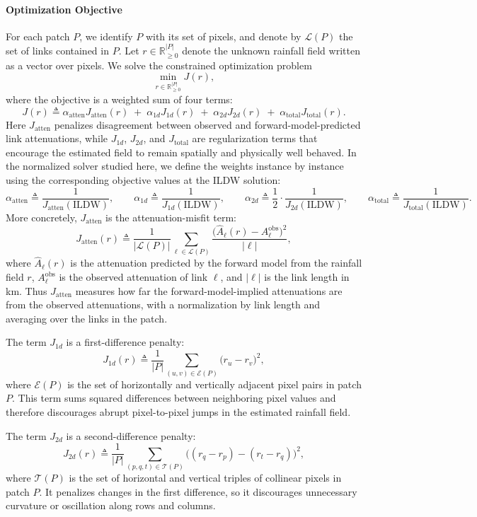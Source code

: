 \documentclass[11pt]{article}
\begin{document}
\paragraph*{Optimization Objective}
For each patch $P$, we identify $P$ with its set of pixels, and denote by $\mathcal{L}(P)$ the set of links contained in $P$. Let $r\in\mathbb{R}_{\ge 0}^{|P|}$ denote the unknown rainfall field written as a vector over pixels. We solve the constrained optimization problem
\[
\min_{r\in\mathbb{R}_{\ge 0}^{|P|}} J(r),
\]
where the objective is a weighted sum of four terms:
\[
J(r)\triangleq
\alpha_{\mathrm{atten}} J_{\mathrm{atten}}(r)
\;+\;
\alpha_{1d} J_{1d}(r)
\;+\;
\alpha_{2d} J_{2d}(r)
\;+\;
\alpha_{\mathrm{total}} J_{\mathrm{total}}(r).
\]
Here $J_{\mathrm{atten}}$ penalizes disagreement between observed and forward-model-predicted link attenuations, while $J_{1d}$, $J_{2d}$, and $J_{\mathrm{total}}$ are regularization terms that encourage the estimated field to remain spatially and physically well behaved. In the normalized solver studied here, we define the weights instance by instance using the corresponding objective values at the ILDW solution:
\[
\alpha_{\mathrm{atten}}\triangleq\frac{1}{J_{\mathrm{atten}}({\mathrm{ILDW}})},\qquad
\alpha_{1d}\triangleq\frac{1}{J_{1d}({\mathrm{ILDW}})},\qquad
\alpha_{2d}\triangleq\frac{1}{2} \cdot\frac{1}{J_{2d}({\mathrm{ILDW}})},\qquad
\alpha_{\mathrm{total}}\triangleq\frac{1}{J_{\mathrm{total}}({\mathrm{ILDW}})}.
\]
More concretely, $J_{\mathrm{atten}}$ is the attenuation-misfit term:
\[
J_{\mathrm{atten}}(r)\triangleq\frac{1}{|\mathcal{L}(P)|}\sum_{\ell\in\mathcal{L}(P)}
\frac{\bigl(\widehat{A}_\ell(r)-A_\ell^{\mathrm{obs}}\bigr)^2}{|\ell|},
\]
where $\widehat{A}_\ell(r)$ is the attenuation predicted by the forward model from the rainfall field $r$, $A_\ell^{\mathrm{obs}}$ is the observed attenuation of link $\ell$, and $|\ell|$ is the link length in km. Thus $J_{\mathrm{atten}}$ measures how far the forward-model-implied attenuations are from the observed attenuations, with a normalization by link length and averaging over the links in the patch.

The term $J_{1d}$ is a first-difference penalty:
\[
J_{1d}(r)\triangleq\frac{1}{|P|}\sum_{(u,v)\in\mathcal{E}(P)}\bigl(r_u-r_v\bigr)^2,
\]
where $\mathcal{E}(P)$ is the set of horizontally and vertically adjacent pixel pairs in patch $P$. This term sums squared differences between neighboring pixel values and therefore discourages abrupt pixel-to-pixel jumps in the estimated rainfall field.

The term $J_{2d}$ is a second-difference penalty:
\[
J_{2d}(r)\triangleq\frac{1}{|P|}\sum_{(p,q,t)\in\mathcal{T}(P)}
\bigl((r_q-r_p)-(r_t-r_q)\bigr)^2,
\]
where $\mathcal{T}(P)$ is the set of horizontal and vertical triples of collinear pixels in patch $P$. It penalizes changes in the first difference, so it discourages unnecessary curvature or oscillation along rows and columns.
\end{document}
